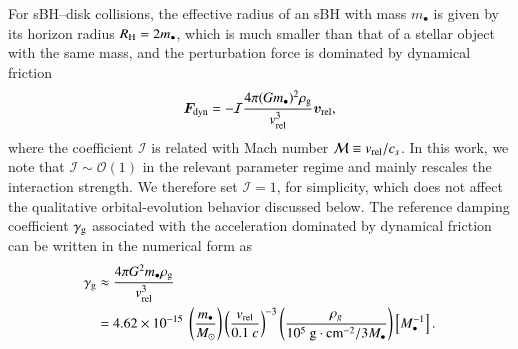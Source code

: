\documentclass[aps,prx,reprint,superscriptaddress,nofootinbib,longbibliography]{revtex4-1}
\begin{document}
For sBH–disk collisions, the effective radius of an sBH with mass $m_{\bullet}$ is given by its horizon radius $R_{\rm H}=2m_{\bullet}$, which is much smaller than that of a stellar object with the same mass, and the perturbation force is dominated by dynamical friction~\cite{Wang2024,Ostriker_1999}
\begin{equation}
    \bm{F}_{\rm dyn}=-\mathcal{I}\frac{4\pi(Gm_{\bullet})^2\rho_{\rm g}}{v_{\rm rel}^{3}}\bm{v}_{\rm rel},
    \label{eq:Fdyn}
\end{equation}
where the coefficient $\mathcal{I}$ is related with Mach number $\mathcal{M}\equiv v_{\rm rel}/c_{s}$. In this work, we note that $\mathcal{I}\sim \mathcal{O}(1)$ in the relevant parameter regime and mainly rescales the interaction strength. We therefore set $\mathcal{I}=1$, for simplicity, which does not affect the qualitative orbital-evolution behavior discussed below. The reference damping coefficient $\gamma_{\rm g}$ associated with the acceleration dominated by dynamical friction can be written in the numerical form as
\begin{equation}
\begin{aligned}
    \gamma_{\rm g}&\approx \frac{4\pi G^2 m_{\bullet}\rho_{\rm g}}{v_{\rm rel}^{3}}\\
    &= 4.62\times 10^{-15}\ \left(\frac{m_{\bullet}}{M_{\odot}}\right)\left(\frac{v_{\rm rel}}{0.1\ c}\right)^{-3} \left(\frac{\rho_g}{ 
    10^{5}\ \mathrm{g\cdot cm^{-2}}/3M_\bullet}\right) \left[M_{\bullet}^{-1}\right].
    \label{eq:dynamical friction gamma}
\end{aligned}
\end{equation}


\end{document}
